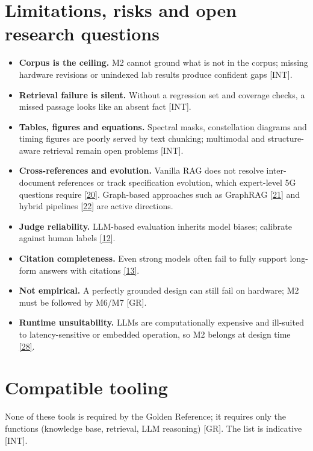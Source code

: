 \documentclass[11pt,a4paper]{article}
\newcommand{\prov}[1]{\textsf{\footnotesize[#1]}}
\begin{document}
\section{Limitations, risks and open research questions}
\begin{itemize}
\item \textbf{Corpus is the ceiling.} M2 cannot ground what is not in the corpus; missing hardware revisions or unindexed lab results produce confident gaps \prov{INT}.
\item \textbf{Retrieval failure is silent.} Without a regression set and coverage checks, a missed passage looks like an absent fact \prov{INT}.
\item \textbf{Tables, figures and equations.} Spectral masks, constellation diagrams and timing figures are poorly served by text chunking; multimodal and structure-aware retrieval remain open problems \prov{INT}.
\item \textbf{Cross-references and evolution.} Vanilla RAG does not resolve inter-document references or track specification evolution, which expert-level 5G questions require \hyperlink{ref20}{[20]}. Graph-based approaches such as GraphRAG \hyperlink{ref21}{[21]} and hybrid pipelines \hyperlink{ref22}{[22]} are active directions.
\item \textbf{Judge reliability.} LLM-based evaluation inherits model biases; calibrate against human labels \hyperlink{ref12}{[12]}.
\item \textbf{Citation completeness.} Even strong models often fail to fully support long-form answers with citations \hyperlink{ref13}{[13]}.
\item \textbf{Not empirical.} A perfectly grounded design can still fail on hardware; M2 must be followed by M6/M7 \prov{GR}.
\item \textbf{Runtime unsuitability.} LLMs are computationally expensive and ill-suited to latency-sensitive or embedded operation, so M2 belongs at design time \hyperlink{ref28}{[28]}.
\end{itemize}
\section{Compatible tooling}
None of these tools is required by the Golden Reference; it requires only the functions (knowledge base, retrieval, LLM reasoning) \prov{GR}. The list is indicative \prov{INT}.
\end{document}
